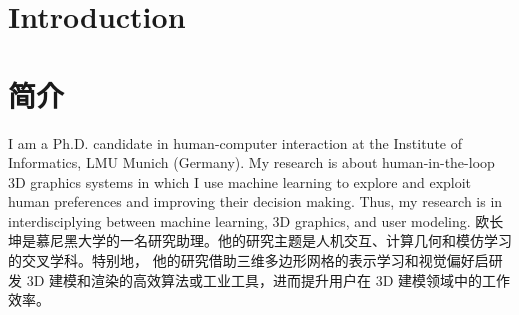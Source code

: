  {
\section{\textbf{Introduction}}
}{
\section{\textbf{简介}}
}
 {
\small
I am a Ph.D. candidate in human-computer interaction at the Institute of Informatics, LMU Munich (Germany). My research is about human-in-the-loop 3D graphics systems in which I use machine learning to explore and exploit human preferences and improving their decision making. Thus, my research is in interdisciplying between machine learning, 3D graphics, and user modeling.
}{
欧长坤是慕尼黑大学的一名研究助理。他的研究主题是人机交互、计算几何和模仿学习的交叉学科。特别地，
他的研究借助三维多边形网格的表示学习和视觉偏好启研发 3D 建模和渲染的高效算法或工业工具，进而提升用户在 3D 建模领域中的工作效率。
}
